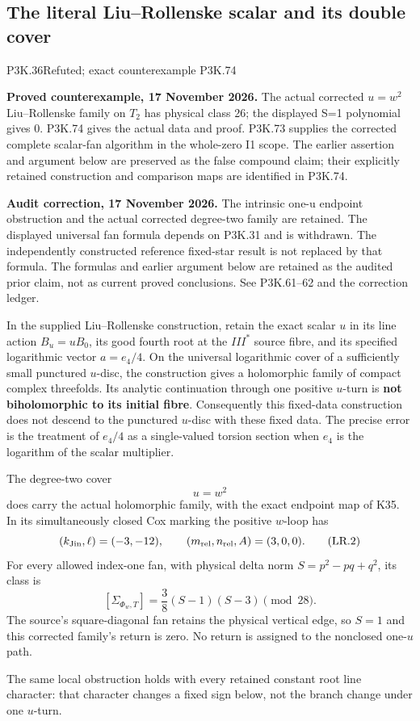 \subsection{The literal Liu--Rollenske scalar and its double cover}
\begin{statement}{P3K.36}{Refuted; exact counterexample P3K.74}
\par\noindent\textbf{Proved counterexample, 17 November 2026.} The actual corrected \(u=w^2\) Liu--Rollenske family on \(T_2\) has physical class 26; the displayed S=1 polynomial gives 0. P3K.74 gives the actual data and proof. P3K.73 supplies the corrected complete scalar-fan algorithm in the whole-zero I1 scope. The earlier assertion and argument below are preserved as the false compound claim; their explicitly retained construction and comparison maps are identified in P3K.74.

\par\noindent\textbf{Audit correction, 17 November 2026.} The intrinsic one-u endpoint obstruction and the actual corrected degree-two family are retained. The displayed universal fan formula depends on P3K.31 and is withdrawn. The independently constructed reference fixed-star result is not replaced by that formula. The formulas and earlier argument below are retained as the audited prior claim, not as current proved conclusions. See P3K.61--62 and the correction ledger.
\medskip

In the supplied Liu--Rollenske construction, retain the exact scalar
\(u\) in its line action \(B_u=uB_0\), its good fourth root at the
\(III^*\) source fibre, and its specified logarithmic vector
\(a=e_4/4\). On the universal logarithmic cover of a sufficiently small
punctured \(u\)-disc, the construction gives a holomorphic family of
compact complex threefolds. Its analytic continuation through one
positive \(u\)-turn is \textbf{not biholomorphic to its initial fibre}.
Consequently this fixed-data construction does not descend to the
punctured \(u\)-disc with these fixed data. The precise error is the treatment of
\(e_4/4\) as a single-valued torsion section when \(e_4\) is the
logarithm of the scalar multiplier.

The degree-two cover
\[
                         u=w^2                                      \tag{LR.1}
\]
does carry the actual holomorphic family, with the exact endpoint map
of K35. In its simultaneously closed Cox marking the positive
\(w\)-loop has
\[
 (k_{\rm Jin},\ell)=(-3,-12),\qquad
 (m_{\rm rel},n_{\rm rel},A)=(3,0,0).                 \tag{LR.2}
\]
For every allowed index-one fan, with physical delta norm
\(S=p^2-pq+q^2\), its class is
\[
       [\Sigma_{\Phi_w,T}]
              =\frac38(S-1)(S-3)\pmod {28}.           \tag{LR.3}
\]
The source's square-diagonal fan retains the physical vertical edge,
so \(S=1\) and this corrected family's return is zero. No return is
assigned to the nonclosed one-\(u\) path.

The same local obstruction holds with every retained constant root
line character: that character changes a fixed sign below, not the
branch change under one \(u\)-turn.

\end{statement}

